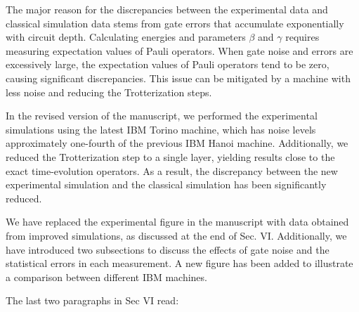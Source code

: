 \documentclass[groupedaddress,prx,floats,superscriptaddress,notitlepages,12pt]{revtex4-2}
\begin{document}
The major reason for the discrepancies between the experimental data and classical simulation data stems from gate errors that accumulate exponentially with circuit depth. Calculating energies and parameters $\beta$ and $\gamma$ requires measuring expectation values of Pauli operators. When gate noise and errors are excessively large, the expectation values of Pauli operators tend to be zero, causing significant discrepancies. This issue can be mitigated by a machine with less noise and reducing the Trotterization steps.

In the revised version of the manuscript, we performed the experimental simulations using the latest IBM Torino machine, which has noise levels approximately one-fourth of the previous IBM Hanoi machine. Additionally, we reduced the Trotterization step to a single layer, yielding results close to the exact time-evolution operators. As a result, the discrepancy between the new experimental simulation and the classical simulation has been significantly reduced. 

We have replaced the experimental figure in the manuscript with data obtained from improved simulations, as discussed at the end of Sec. VI. Additionally, we have introduced two subsections to discuss the effects of gate noise and the statistical errors in each measurement. A new figure has been added to illustrate a comparison between different IBM machines.

The last two paragraphs in Sec VI read:
\end{document}
